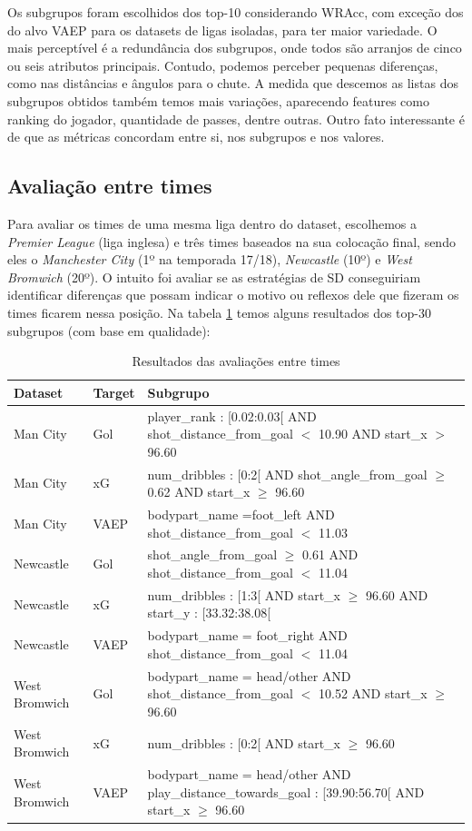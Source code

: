 \documentclass{article}
\begin{document}
Os subgrupos foram escolhidos dos top-10 considerando WRAcc, com exceção dos do alvo VAEP para os 
datasets de ligas isoladas, para ter maior variedade. O mais perceptível é a redundância dos subgrupos, 
onde todos são arranjos de cinco ou seis atributos principais. Contudo, podemos perceber pequenas 
diferenças, como nas distâncias e ângulos para o chute. A medida que descemos as listas dos subgrupos 
obtidos também temos mais variações, aparecendo features como ranking do jogador, quantidade de passes, 
dentre outras. Outro fato interessante é de que as métricas concordam entre si, nos subgrupos e nos valores.

\subsection{Avaliação entre times}

Para avaliar os times de uma mesma liga dentro do dataset, escolhemos a \textit{Premier League} (liga 
inglesa) e três times baseados na sua colocação final, sendo eles o \textit{Manchester City} (1º na 
temporada 17/18), \textit{Newcastle} (10º) e \textit{West Bromwich} (20º). O intuito foi avaliar se 
as estratégias de SD conseguiriam identificar diferenças que possam indicar o motivo ou reflexos dele 
que fizeram os times ficarem nessa posição. Na tabela \ref{tab:resultTimes} temos alguns resultados dos 
top-30 subgrupos (com base em qualidade):

\begin{table}[H]
	\centering
	\label{tab:resultTimes}
	\begin{tabular}{|l|l|l|}
		\hline
		\textbf{Dataset} & \textbf{Target} & 
		\textbf{Subgrupo}
		\\
		\hline
		Man City & Gol & player\_rank : [0.02:0.03[ AND shot\_distance\_from\_goal $<$ 10.90 
		AND start\_x $>$ 96.60
		\\
		\hline
		Man City & xG & num\_dribbles : [0:2[ AND shot\_angle\_from\_goal $\geq$ 0.62 AND 
		start\_x $\geq$ 96.60
		\\
		\hline
		Man City & VAEP &  bodypart\_name =foot\_left AND shot\_distance\_from\_goal $<$ 11.03
		\\
		\hline
		Newcastle & Gol & shot\_angle\_from\_goal $\geq$ 0.61 AND shot\_distance\_from\_goal $ < $ 11.04
		\\
		\hline
		Newcastle & xG & num\_dribbles : [1:3[ AND start\_x $\geq$ 96.60 AND start\_y : [33.32:38.08[
		\\
		\hline
		Newcastle & VAEP & bodypart\_name = foot\_right AND shot\_distance\_from\_goal $<$ 11.04
		\\
		\hline
		West Bromwich & Gol & bodypart\_name = head/other AND 
		shot\_distance\_from\_goal $<$ 10.52 AND start\_x $\geq$ 96.60 
		\\
		\hline
		West Bromwich & xG & num\_dribbles : [0:2[ AND start\_x $\geq$ 96.60
		\\
		\hline
		West Bromwich & VAEP & bodypart\_name = head/other AND 
		play\_distance\_towards\_goal : [39.90:56.70[ AND start\_x $\geq$ 96.60
		\\
		\hline
	\end{tabular}
	\caption{Resultados das avaliações entre times}
\end{table}
\end{document}
